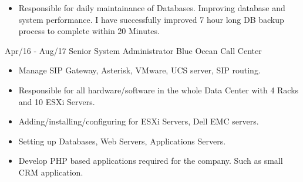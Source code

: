 \documentclass[]{friggeri-cv}
\begin{document}
\begin{entrylist}
{\begin{itemize}
        \item Responsible for daily maintainance of Databases. Improving database and system performance. I have successfully improved 7 hour long DB backup process to complete within 20 Minutes.
      \end{itemize}
    }
  \entry
    {Apr/16 - Aug/17}
    {Senior System Administrator}
    {Blue Ocean Call Center}
    {
      \begin{itemize}
        \item Manage SIP Gateway, Asterisk, VMware, UCS server, SIP routing.
        \item Responsible for all hardware/software in the whole Data Center with 4 Racks and 10 ESXi Servers.
        \item Adding/installing/configuring for ESXi Servers, Dell EMC servers.
        \item Setting up Databases, Web Servers, Applications Servers.
        \item Develop PHP based applications required for the company. Such as small CRM application.
      \end{itemize}
      }
\end{entrylist}

\newpage
\end{document}
